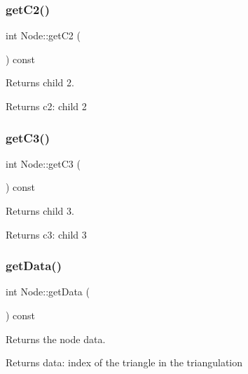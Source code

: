 \subsubsection{\texorpdfstring{get\+C2()}{getC2()}}
{\footnotesize\ttfamily int Node\+::get\+C2 (\begin{DoxyParamCaption}{ }\end{DoxyParamCaption}) const}



Returns child 2. 

\begin{DoxyReturn}{Returns}
c2\+: child 2 
\end{DoxyReturn}
\mbox{\label{classNode_a3b941af12dfb8085e4f621ed62469ba5}} 
\subsubsection{\texorpdfstring{get\+C3()}{getC3()}}
{\footnotesize\ttfamily int Node\+::get\+C3 (\begin{DoxyParamCaption}{ }\end{DoxyParamCaption}) const}



Returns child 3. 

\begin{DoxyReturn}{Returns}
c3\+: child 3 
\end{DoxyReturn}
\mbox{\label{classNode_a4bf12425ae4895ac3ec27c91fea8f646}} 
\subsubsection{\texorpdfstring{get\+Data()}{getData()}}
{\footnotesize\ttfamily int Node\+::get\+Data (\begin{DoxyParamCaption}{ }\end{DoxyParamCaption}) const}



Returns the node data. 

\begin{DoxyReturn}{Returns}
data\+: index of the triangle in the triangulation 
\end{DoxyReturn}
\mbox{\label{classNode_a0c5b662d3bfbb856292a9aab878ed622}} 
